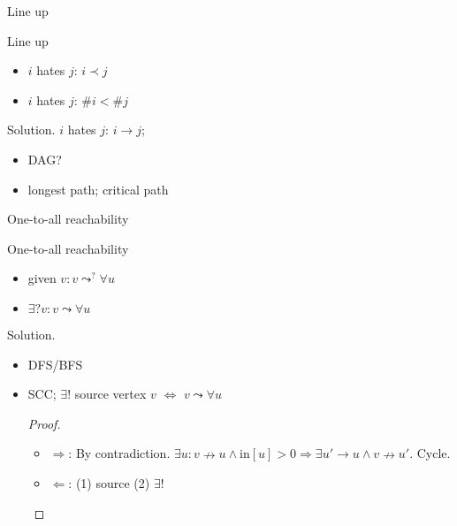 \begin{frame}{Line up}
  \begin{exampleblock}{Line up }
    \begin{itemize}
      \item $i$ hates $j$: $i \prec j$
      \item $i$ hates $j$: $\# i < \# j$
    \end{itemize}
  \end{exampleblock}

  \begin{block}{Solution.}
    $i$ hates $j$: $i \to j$;
    \begin{itemize}
      \item DAG?
      \item longest path; critical path
      \end{itemize}
  \end{block}
\end{frame}
\begin{frame}{One-to-all reachability}
  \begin{exampleblock}{One-to-all reachability }
    \begin{itemize}
      \item given $v: v \leadsto^{?} \forall u$
      \item $\exists? v: v \leadsto \forall u$
    \end{itemize}
  \end{exampleblock}

  \begin{block}{Solution.}
    \begin{itemize}
      \item DFS/BFS
      \item SCC; $\exists!$ source vertex $v$ $\iff$ $v \leadsto \forall u$
	\begin{proof}
	  \begin{itemize}
	    \item $\Rightarrow$: By contradiction. $\exists u: v \nrightarrow u \land \text{in}[u] > 0 \Rightarrow \exists u' \to u \land v \nrightarrow u'$. Cycle. 
	    \item $\Leftarrow$: (1) source (2) $\exists !$
	  \end{itemize}
	\end{proof}
    \end{itemize}
  \end{block}
\end{frame}
